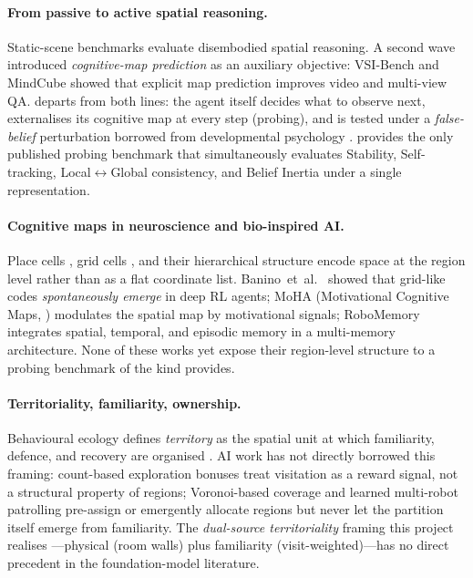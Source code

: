 \paragraph{From passive to active spatial reasoning.}
Static-scene benchmarks \citep{weston2015babi,shi2022stepgame,
mirzaee2021spartqa,chen2024spatialvlm,ma20243dsr,yang2025mmsi} evaluate
disembodied spatial reasoning. A second wave introduced
\emph{cognitive-map prediction} as an auxiliary objective:
VSI-Bench \citep{yang2025vsi} and MindCube \citep{yin2025mindcube}
showed that explicit map prediction improves video and multi-view QA.
\tos \citep{zhang2026theoryofspace} departs from both lines: the agent
itself decides what to observe next, externalises its cognitive map at
every step (probing), and is tested under a \emph{false-belief}
perturbation borrowed from developmental psychology
\citep{wimmer1983false}. \tos provides the only published probing
benchmark that simultaneously evaluates Stability, Self-tracking,
Local$\leftrightarrow$Global consistency, and Belief Inertia under a
single representation.

\paragraph{Cognitive maps in neuroscience and bio-inspired AI.}
Place cells \citep{okeefe1971}, grid cells \citep{hafting2005}, and
their hierarchical structure \citep{stensola2012} encode space at the
region level rather than as a flat coordinate list. Banino~et~al.\
\citep{banino2018grid} showed that grid-like codes \emph{spontaneously
emerge} in deep RL agents; MoHA (Motivational Cognitive Maps,
\citet{mohacog2025}) modulates the spatial map by motivational
signals; RoboMemory \citep{robomemory2024} integrates spatial,
temporal, and episodic memory in a multi-memory architecture. None of
these works yet expose their region-level structure to a probing
benchmark of the kind \tos provides.

\paragraph{Territoriality, familiarity, ownership.}
Behavioural ecology defines \emph{territory} as the spatial unit at
which familiarity, defence, and recovery are organised
\citep{burt1943,powell2012homerange}. AI work has not directly
borrowed this framing: count-based exploration bonuses
\citep{burda2018rnd,pathak2017icm} treat visitation as a reward
signal, not a structural property of regions; Voronoi-based coverage
\citep{cortes2004coverage} and learned multi-robot patrolling
\citep{magec2024,patrolppo2025} pre-assign or emergently allocate
regions but never let the partition itself emerge from familiarity.
The \emph{dual-source territoriality} framing this project realises
---physical (room walls) plus familiarity (visit-weighted)---has no
direct precedent in the foundation-model literature.

